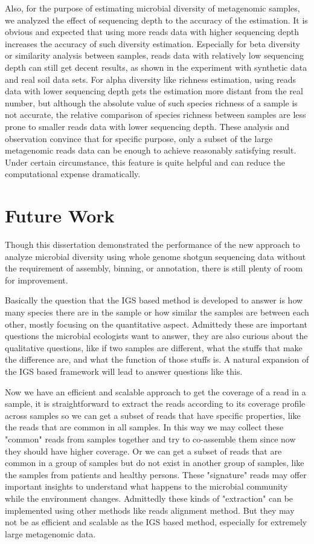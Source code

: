 Also, for the purpose of estimating microbial diversity of metagenomic samples,
we analyzed the effect of sequencing depth to the accuracy of the estimation.
It is obvious and expected that using more reads data with higher sequencing
depth increases the accuracy of such diversity estimation. Especially for beta
diversity or similarity analysis between samples, reads data with relatively
low sequencing depth can still get decent results, as shown in the experiment
with synthetic data and real soil data sets. For alpha diversity like richness
estimation, using reads data with lower sequencing depth gets the estimation
more distant from the real number, but although the absolute value of such species
richness of a sample is not accurate, the relative comparison of species
richness between samples are less prone to smaller reads data with lower
sequencing depth. These analysis and observation convince that for specific
purpose, only a subset of the large metagenomic reads data can be enough to
achieve reasonably satisfying result. Under certain circumstance, this feature
is quite helpful and can reduce the computational expense dramatically. 


\section{Future Work}


Though this dissertation demonstrated the performance of the new approach to 
analyze microbial diversity
using whole genome shotgun sequencing data without the requirement of assembly,
binning, or annotation, there is still plenty of room for improvement.  

Basically the question that the IGS based method is developed to answer is how many
species there are in the sample or how similar the samples are between each
other, mostly focusing on the quantitative aspect. Admittedy these are 
important questions the microbial ecologists want to answer, they are also
curious about the qualitative questions, like if two samples are different, what
the stuffs that make the difference are, and what  the function of
those stuffs is.\cite{Xu2014}  A natural expansion of the IGS based framework will lead to
answer questions like this. 

Now we have an efficient and scalable approach to get the coverage of a read in
a sample, it is straightforward to extract the reads according to its coverage
profile across samples so we can get a subset of reads that have specific
properties, like the reads that are common in all samples. In this way we
may collect these "common" reads from samples together and try to co-assemble
them since now they should have higher coverage. Or we can get a subset of
reads that are common in a group of samples but do not exist in another group
of samples, like the samples from patients and healthy persons. These
"signature" reads may offer important insights to understand what happens
to the microbial community while the environment changes. Admittedly these
kinds of "extraction" can be implemented using other methods like reads 
alignment method. But they may not be as efficient and scalable as the IGS
based method, especially for extremely large metagenomic data.


